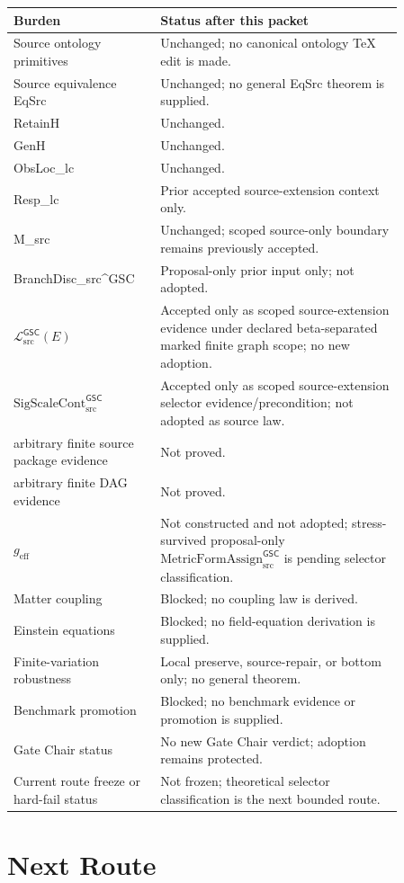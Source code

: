 \documentclass[11pt]{article}
\newcommand{\MetricData}{\mathcal{L}_{\mathrm{src}}^{\mathsf{GSC}}}
\newcommand{\geff}{g_{\mathrm{eff}}}
\newcommand{\SigScaleCont}{\mathrm{SigScaleCont}_{\mathrm{src}}^{\mathsf{GSC}}}
\newcommand{\MetricFormAssign}{\mathrm{MetricFormAssign}_{\mathrm{src}}^{\mathsf{GSC}}}
\begin{document}
\begin{longtable}{p{0.30\linewidth}p{0.56\linewidth}}
\toprule
Burden & Status after this packet \\
\midrule
Source ontology primitives & Unchanged; no canonical ontology TeX edit is
made. \\
Source equivalence EqSrc & Unchanged; no general EqSrc theorem is supplied. \\
RetainH & Unchanged. \\
GenH & Unchanged. \\
ObsLoc\_lc & Unchanged. \\
Resp\_lc & Prior accepted source-extension context only. \\
M\_src & Unchanged; scoped source-only boundary remains previously accepted. \\
BranchDisc\_src\textasciicircum GSC & Proposal-only prior input only; not
adopted. \\
\(\MetricData(E)\) & Accepted only as scoped source-extension evidence under
declared beta-separated marked finite graph scope; no new adoption. \\
\(\SigScaleCont\) & Accepted only as scoped source-extension selector
evidence/precondition; not adopted as source law. \\
arbitrary finite source package evidence & Not proved. \\
arbitrary finite DAG evidence & Not proved. \\
\(\geff\) & Not constructed and not adopted; stress-survived proposal-only
\(\MetricFormAssign\) is pending selector classification. \\
Matter coupling & Blocked; no coupling law is derived. \\
Einstein equations & Blocked; no field-equation derivation is supplied. \\
Finite-variation robustness & Local preserve, source-repair, or bottom only;
no general theorem. \\
Benchmark promotion & Blocked; no benchmark evidence or promotion is supplied. \\
Gate Chair status & No new Gate Chair verdict; adoption remains protected. \\
Current route freeze or hard-fail status & Not frozen; theoretical selector
classification is the next bounded route. \\
\bottomrule
\end{longtable}

\section{Next Route}
\end{document}
